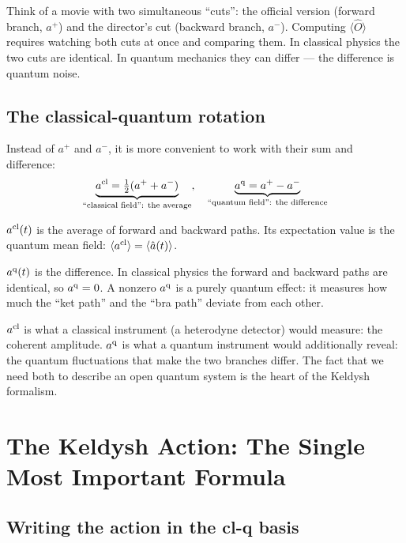 \documentclass[12pt]{article}
\newcommand{\cl}{{\rm cl}}
\newcommand{\q}{{\rm q}}
\newcommand{\av}[1]{\langle #1 \rangle}
\providecommand{\cl}{{\rm cl}}
\providecommand{\q}{{\rm q}}
\begin{document}
\begin{analogy}
Think of a movie with two simultaneous ``cuts'': the official
version (forward branch, $a^+$) and the director's cut
(backward branch, $a^-$). Computing $\av{\hat{O}}$ requires
watching both cuts at once and comparing them. In classical
physics the two cuts are identical. In quantum mechanics they
can differ --- the difference is quantum noise.
\end{analogy}

\subsection{The classical-quantum rotation}

Instead of $a^+$ and $a^-$, it is more convenient to work with
their sum and difference:
\begin{equation}
  \underbrace{a^\cl = \tfrac{1}{2}(a^+ + a^-)}_{\text{``classical field'': the average}},\quad
  \underbrace{a^\q = a^+ - a^-}_{\text{``quantum field'': the difference}}
  \label{eq:clq}
\end{equation}

\textbf{$a^\cl(t)$} is the average of forward and backward paths.
Its expectation value is the quantum mean field:
$\av{a^\cl} = \av{\hat{a}(t)}$.

\textbf{$a^\q(t)$} is the difference. In classical physics the
forward and backward paths are identical, so $a^\q = 0$. A
nonzero $a^\q$ is a purely quantum effect: it measures how much
the ``ket path'' and the ``bra path'' deviate from each other.

\begin{idea}
$a^\cl$ is what a classical instrument (a heterodyne detector)
would measure: the coherent amplitude. $a^\q$ is what a quantum
instrument would additionally reveal: the quantum fluctuations
that make the two branches differ. The fact that we need both
to describe an open quantum system is the heart of the Keldysh
formalism.
\end{idea}

\section{The Keldysh Action: The Single Most Important Formula}

\subsection{Writing the action in the cl-q basis}
\end{document}
